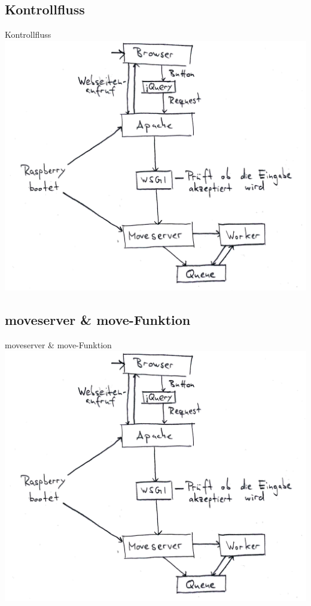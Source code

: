 \documentclass{beamer}
\begin{document}
\subsection{Kontrollfluss}
\begin{frame}{Kontrollfluss}
	\center\includegraphics[height=.8\textheight]{kontrollflussdiagramm.png}
\end{frame}

\subsection{moveserver \& move-Funktion}
\begin{frame}{moveserver \& move-Funktion}
	\center\includegraphics[height=.8\textheight]{kontrollflussdiagramm.png}
\end{frame}
\end{document}
